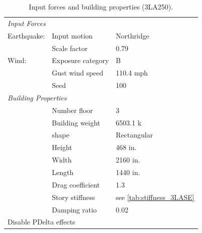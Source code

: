 \documentclass[onecolumn, fleqn]{article}
\begin{document}
\begin{table}[H]
	\centering \caption{Input forces and building properties (3LA250).}
	\begin{tabular}{lll}
	\toprule
	\multicolumn{3}{l}{\textit{Input Forces}}					\\
	\cmidrule(rl){1-3}
	Earthquake:		& Input motion		& Northridge			\\
					& Scale factor		& 0.79					\\
	Wind:			& Exposure category	& B						\\
					& Gust wind speed	& 110.4 mph				\\
					& Seed				& 100					\\
	\midrule
	\multicolumn{3}{l}{\textit{Building Properties}}			\\
	\cmidrule(rl){1-3}
					& Number floor		& 3						\\
					& Building weight	& 6503.1 k				\\
					& shape				& Rectangular			\\
					& Height			& 468 in.				\\
					& Width				& 2160 in.				\\
					& Length			& 1440 in.				\\
					& Drag coefficient	& 1.3					\\
					& Story stiffness	& see \cref{tab:stiffness_3LASE}				\\
					& Damping ratio		& 0.02					\\
	\midrule
	\multicolumn{3}{l}{Disable PDelta effects}					\\
	\bottomrule
	\end{tabular}
\end{table}
\end{document}
